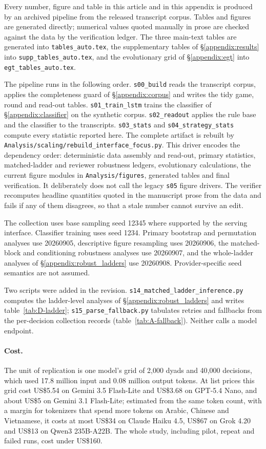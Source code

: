 \documentclass[openacc]{rsproca_new}
\newcommand{\rev}[1]{{\color{red}#1}}
\newcommand{\rev}[1]{#1}
\begin{document}
Every number, figure and table in this article and in this appendix is produced
by an archived pipeline from the released transcript corpus. Tables and figures
are generated directly; numerical values quoted manually in prose are checked
against the data by the verification ledger. The three main-text tables are
generated into \texttt{tables\_auto.tex}, the supplementary tables of
\S\ref{appendix:results} into \texttt{supp\_tables\_auto.tex}, and the
evolutionary grid of \S\ref{appendix:egt} into \texttt{egt\_tables\_auto.tex}.

The pipeline runs in the following order. \texttt{s00\_build} reads the
transcript corpus, applies the completeness guard of
\S\ref{appendix:corpus} and writes the tidy game, round and read-out tables.
\texttt{s01\_train\_lstm} trains the classifier of \S\ref{appendix:classifier}
on the synthetic corpus. \texttt{s02\_readout} applies the rule base and the
classifier to the transcripts. \texttt{s03\_stats} and
\texttt{s04\_strategy\_stats} compute every statistic reported here.
The complete artifact is rebuilt by
\texttt{Analysis/scaling/rebuild\_interface\_focus.py}. This driver encodes the
dependency order: deterministic data assembly and read-out, primary statistics,
matched-ladder and reviewer robustness ledgers, evolutionary calculations, the
current figure modules in \texttt{Analysis/figures}, generated tables and final
verification. It deliberately does not call the legacy \texttt{s05} figure
drivers. The verifier recomputes headline quantities quoted in the manuscript
prose from the data and fails if any of them disagrees, so that a stale number
cannot survive an edit.

The collection uses base sampling seed 12345 where supported by the serving
interface. Classifier training uses seed 1234. Primary bootstrap and permutation
analyses use 20260905, descriptive figure resampling uses 20260906, the
matched-block and conditioning robustness analyses use 20260907\rev{, and the
whole-ladder analyses of \S\ref{appendix:robust_ladders} use 20260908}. Provider-specific
seed semantics are not assumed.

\rev{Two scripts were added in the revision.
\texttt{s14\_matched\_ladder\_inference.py} computes the ladder-level analyses
of \S\ref{appendix:robust_ladders} and writes table~\ref{tab:D-ladder};
\texttt{s15\_parse\_fallback.py} tabulates retries and fallbacks from the
per-decision collection records (table~\ref{tab:A-fallback}). Neither calls a
model endpoint.}

\rev{\paragraph{Cost.} The unit of replication is one model's grid of
2{,}000 dyads and 40{,}000 decisions, which used 17.8 million input and 0.08
million output tokens. At list prices this grid cost US\$5.54 on Gemini 3.5
Flash-Lite and US\$3.68 on GPT-5.4 Nano, and about US\$5 on Gemini 3.1
Flash-Lite; estimated from the same token count, with a margin for tokenizers
that spend more tokens on Arabic, Chinese and Vietnamese, it costs at most
US\$34 on Claude Haiku 4.5, US\$67 on Grok 4.20 and US\$13 on Qwen3
235B-A22B. The whole study, including pilot, repeat and failed runs, cost
under US\$160.}
\end{document}
